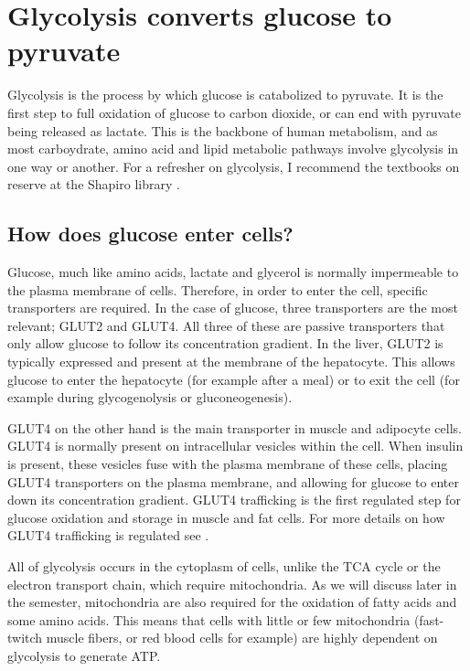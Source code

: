 \documentclass{tufte-handout}
\begin{document}
\pagebreak

\section{Glycolysis converts glucose to pyruvate}

Glycolysis is the process by which glucose is catabolized to pyruvate.  It is the first step to full oxidation of glucose to carbon dioxide, or can end with pyruvate being released as lactate.  This is the backbone of human metabolism, and as most carboydrate, amino acid and lipid metabolic pathways involve glycolysis in one way or another.  For a refresher on glycolysis, I recommend the textbooks on reserve at the Shapiro library \citep{Berg2013,Ferrier2017}.

\subsection{How does glucose enter cells?}

Glucose, much like amino acids, lactate and glycerol is normally impermeable to the plasma membrane of cells.  Therefore, in order to enter the cell, specific transporters are required.  In the case of glucose, three transporters are the most relevant;  GLUT2 and GLUT4.  All three of these are passive transporters that only allow glucose to follow its concentration gradient.  In the liver, GLUT2 is typically expressed and present at the membrane of the hepatocyte.  This allows glucose to enter the hepatocyte (for example after a meal) or to exit the cell (for example during glycogenolysis or gluconeogenesis).

GLUT4 on the other hand is the main transporter in muscle and adipocyte cells.  GLUT4 is normally present on intracellular vesicles within the cell.  When insulin is present, these vesicles fuse with the plasma membrane of these cells, placing GLUT4 transporters on the plasma membrane, and allowing for glucose to enter down its concentration gradient.  GLUT4 trafficking is the first regulated step for glucose oxidation and storage in muscle and fat cells.  For more details on how GLUT4 trafficking is regulated see \citep{Leto2013}.


  All of glycolysis occurs in the cytoplasm of cells, unlike the TCA cycle or the electron transport chain, which require mitochondria.  As we will discuss later in the semester, mitochondria are also required for the oxidation of fatty acids and some amino acids.  This means that cells with little or few mitochondria (fast-twitch muscle fibers, or red blood cells for example) are highly dependent on glycolysis to generate ATP.
\end{document}
